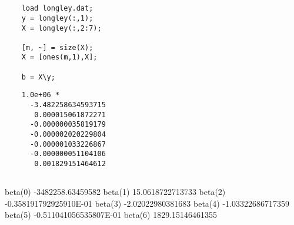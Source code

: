 \documentclass[12pt]{article}
\begin{document}
\subsection{} %

\subsection{} %


\section{}

\section{}

\subsection{} %

\begin{minipage}{\linewidth}
\begin{lstlisting}
    load longley.dat;
    y = longley(:,1);
    X = longley(:,2:7);

    [m, ~] = size(X);
    X = [ones(m,1),X];

    b = X\y;
\end{lstlisting}
\end{minipage}

\begin{minipage}{\linewidth}
\begin{lstlisting}
    1.0e+06 *
      -3.482258634593715
       0.000015061872271
      -0.000000035819179
      -0.000002020229804
      -0.000001033226867
      -0.000000051104106
       0.001829151464612
\end{lstlisting}
\end{minipage}

\subsection{} %
beta(0)    -3482258.63459582
beta(1)    15.0618722713733
beta(2)    -0.358191792925910E-01
beta(3)    -2.02022980381683
beta(4)    -1.03322686717359
beta(5)    -0.511041056535807E-01
beta(6)    1829.15146461355

\subsection{} %
\end{document}
